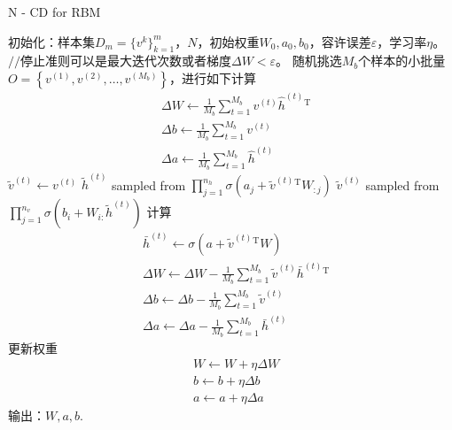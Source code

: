             \begin{algorithm}[htbp]
                \caption{N - CD for RBM}\label{code:CD}
                \begin{algorithmic}[1]
                    \State 初始化：样本集$D_m = \{v^k\}_{k=1}^m$，$N$，初始权重$W_0,a_0,b_0$，容许误差$\varepsilon$，学习率$\eta$。
                        \State $//$停止准则可以是最大迭代次数或者梯度$\Delta W < \varepsilon$。
                        \State 随机挑选$M_b$个样本的小批量$O = \left\{v^{(1)},v^{(2)},\dots,v^{(M_b)}\right\}$，进行如下计算
                        \begin{align*}
                        & \Delta W \leftarrow \frac{1}{M_b}\sum_{t=1}^{M_b}v^{(t)}\hat{h}^{(t)}{}^\mathrm{T}\\
                        & \Delta b \leftarrow \frac{1}{M_b}\sum_{t=1}^{M_b}v^{(t)}\\
                        & \Delta a \leftarrow \frac{1}{M_b}\sum_{t=1}^{M_b}\hat{h}^{(t)}
                        \end{align*}
                            \State $\tilde{v}^{(t)} \leftarrow v^{(t)}$
                        \EndFor
                                \State $\tilde{h}^{(t)}$ sampled from
                                $\prod_{j=1}^{n_h}\sigma \left( a_j+\tilde{v}^{(t)}{}^\mathrm{T} W_{:j} \right) $
                                \State $\tilde{v}^{(t)}$ sampled from
                                $\prod_{j=1}^{n_v}\sigma \left( b_i+W_{i:}\tilde{h}^{(t)} \right)$
                            \EndFor
                        \EndFor
                        \State 计算
                        \begin{align*}
                        & \bar{h}^{(t)} \leftarrow \sigma \left( a+ \tilde{v}^{(t)}{}^\mathrm{T}W \right) \\
                        & \Delta W \leftarrow \Delta W - \frac{1}{M_b}\sum_{t=1}^{M_b} \tilde{v}^{(t)}\bar{h}^{(t)}{}^\mathrm{T}\\
                        & \Delta b \leftarrow \Delta b - \frac{1}{M_b}\sum_{t=1}^{M_b} \tilde{v}^{(t)}\\
                        & \Delta a \leftarrow \Delta a - \frac{1}{M_b}\sum_{t=1}^{M_b} \bar{h}^{(t)}
                        \end{align*}
                        \State 更新权重
                        \begin{align*}
                        & W \leftarrow W + \eta \Delta W\\
                        & b \leftarrow b+ \eta \Delta b\\
                        & a \leftarrow a+ \eta \Delta a
                        \end{align*}
                    \EndWhile
                    \State 输出：$W,a,b$.
                \end{algorithmic}
            \end{algorithm}

